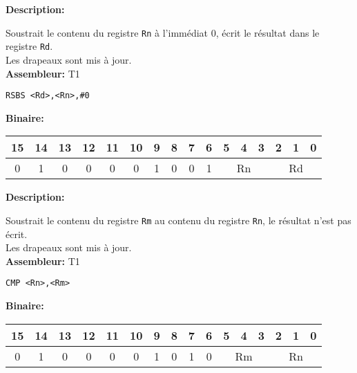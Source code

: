 \documentclass{article}
\newcounter{subsubsubsection}[subsubsection]
\begin{document}

\textbf{Description: }

Soustrait le contenu du registre \texttt{Rn} à l'immédiat 0, écrit le résultat dans le registre \texttt{Rd}.\\
Les drapeaux sont mis à jour.\\

\textbf{Assembleur:} T1

\begin{lstlisting}
RSBS <Rd>,<Rn>,#0
\end{lstlisting}

\textbf{Binaire:}\\

\begin{tabular}{| c c c c c c c c c c c c c c c c |}
\hline
15 & 14 & 13 & 12 & 11 & 10 & \multicolumn{1}{|c}{9} & 8 & 7 & 6 & \multicolumn{1}{|c}{5} & 4 & 3 & \multicolumn{1}{|c}{2} & 1 & 0 \\
\hline
0 & 1 & 0 & 0 & 0 & 0 & \multicolumn{1}{|c}{1} & 0 & 0 & 1 & \multicolumn{3}{|c}{Rn} & \multicolumn{3}{|c|}{Rd} \\
\hline
\end{tabular}




\textbf{Description: }

Soustrait le contenu du registre \texttt{Rm} au contenu du registre \texttt{Rn}, le résultat n'est pas écrit.\\
Les drapeaux sont mis à jour.\\

\textbf{Assembleur:} T1

\begin{lstlisting}
CMP <Rn>,<Rm>
\end{lstlisting}

\textbf{Binaire:}\\

\begin{tabular}{| c c c c c c c c c c c c c c c c |}
\hline
15 & 14 & 13 & 12 & 11 & 10 & \multicolumn{1}{|c}{9} & 8 & 7 & 6 & \multicolumn{1}{|c}{5} & 4 & 3 & \multicolumn{1}{|c}{2} & 1 & 0 \\
\hline
0 & 1 & 0 & 0 & 0 & 0 & \multicolumn{1}{|c}{1} & 0 & 1 & 0 & \multicolumn{3}{|c}{Rm} & \multicolumn{3}{|c|}{Rn} \\
\hline
\end{tabular}
\end{document}
